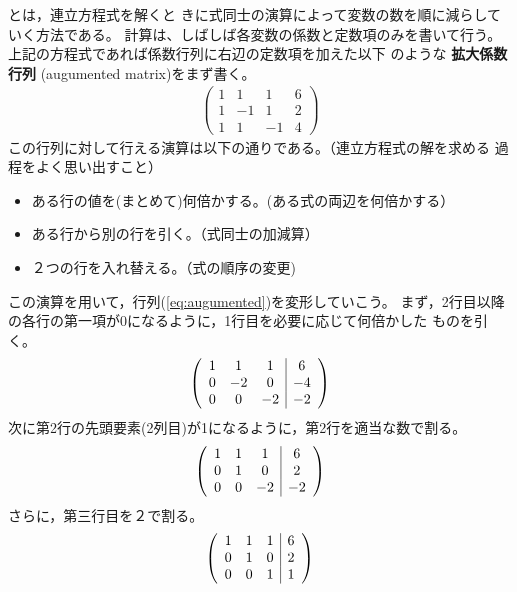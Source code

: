 \documentclass[twocolumn,11pt]{jarticle}
\begin{document}
\comment
{}とは，連立方程式を解くと
きに式同士の演算によって変数の数を順に減らしていく方法である。
計算は、しばしば各変数の係数と定数項のみを書いて行う。
上記の方程式であれば係数行列に右辺の定数項を加えた以下
のような
\textbf{拡大係数行列}
(augumented matrix)をまず書く。
\begin{align}
  \left(
  \begin{array}{ccc|c}
    1 & 1 & 1 & 6 \\
    1 & -1 & 1 & 2 \\
    1 & 1 & -1 & 4
  \end{array}\right)\label{eq:augumented}
\end{align}
この行列に対して行える演算は以下の通りである。（連立方程式の解を求める
過程をよく思い出すこと） 
\begin{itemize}
\item ある行の値を(まとめて)何倍かする。(ある式の両辺を何倍かする）
\item ある行から別の行を引く。（式同士の加減算）
\item ２つの行を入れ替える。（式の順序の変更)
\end{itemize}
この演算を用いて，行列(\ref{eq:augumented})を変形していこう。
まず，2行目以降の各行の第一項が0になるように，1行目を必要に応じて何倍かした
ものを引く。
\begin{align}
  \left(
  \begin{array}{ccc|c}
    1 & 1 & 1 & 6 \\
    0 & -2 & 0 & -4 \\
    0 & 0 & -2 & -2
  \end{array}\right)\notag
\end{align}
次に第2行の先頭要素(2列目)が1になるように，第2行を適当な数で割る。
\begin{align}
  \left(
  \begin{array}{ccc|c}
    1 & 1 & 1 & 6 \\
    0 & 1 & 0 & 2 \\
    0 & 0 & -2 & -2
  \end{array}\right)\notag
\end{align}
さらに，第三行目を２で割る。
\begin{align}
  \left(
  \begin{array}{ccc|c}
    1 & 1 & 1 & 6 \\
    0 & 1 & 0 & 2 \\
    0 & 0 & 1 & 1
  \end{array}\right)\notag
\end{align}
\end{document}
